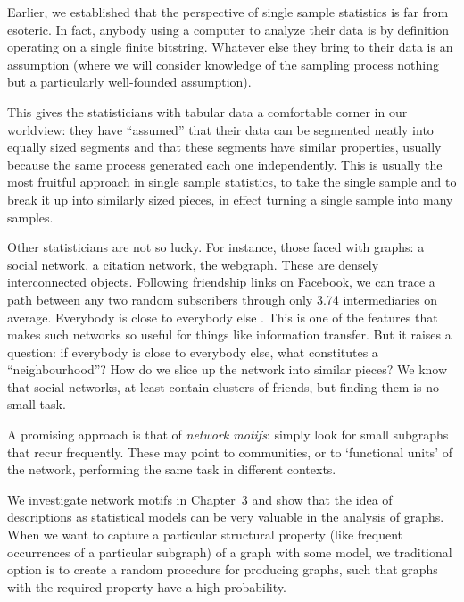 


Earlier, we established that the perspective of single sample statistics is far from esoteric. In fact, anybody using a computer to analyze their data is by definition operating on a single finite bitstring. Whatever else they bring to their data is an assumption (where we will consider knowledge of the sampling process nothing but a particularly well-founded assumption).

This gives the statisticians with tabular data a comfortable corner in our worldview: they have ``assumed'' that their data can be segmented neatly into equally sized segments and that these segments have similar properties, usually because the same process generated each one independently. This is usually the most fruitful approach in single sample statistics, to take the single sample and to break it up into similarly sized pieces, in effect turning a single sample into many samples. 

Other statisticians are not so lucky. For instance, those faced with graphs: a social network, a citation network, the webgraph. These are densely interconnected objects. Following friendship links on Facebook, we can trace a path between any two random subscribers through only 3.74 intermediaries on average. Everybody is close to everybody else \cite{backstrom2012four}. This is one of the features that makes such networks so useful for things like information transfer. But it raises a question: if everybody is close to everybody else, what constitutes a ``neighbourhood''? How do we slice up the network into similar pieces? We know that social networks, at least contain clusters of friends, but finding them is no small task.

A promising approach is that of \emph{network motifs}: simply look for small subgraphs that recur frequently. These may point to communities, or to `functional units' of the network, performing the same task in different contexts. 

We investigate network motifs in Chapter~3 and show that the idea of descriptions as statistical models can be very valuable in the analysis of graphs. When we want to capture a particular structural property (like frequent occurrences of a particular subgraph) of a graph with some model, we traditional option is to create a random procedure for producing graphs, such that graphs with the required property have a high probability. 

